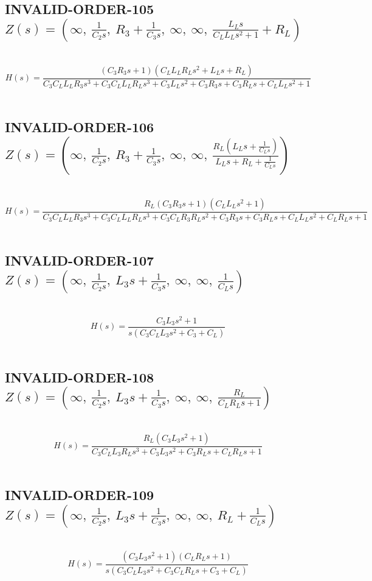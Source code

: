 \documentclass{article}
\begin{document}
\subsection{INVALID-ORDER-105 $Z(s) = \left( \infty, \  \frac{1}{C_{2} s}, \  R_{3} + \frac{1}{C_{3} s}, \  \infty, \  \infty, \  \frac{L_{L} s}{C_{L} L_{L} s^{2} + 1} + R_{L}\right)$ } \ 
\textbf{\[H(s) = \frac{\left(C_{3} R_{3} s + 1\right) \left(C_{L} L_{L} R_{L} s^{2} + L_{L} s + R_{L}\right)}{C_{3} C_{L} L_{L} R_{3} s^{3} + C_{3} C_{L} L_{L} R_{L} s^{3} + C_{3} L_{L} s^{2} + C_{3} R_{3} s + C_{3} R_{L} s + C_{L} L_{L} s^{2} + 1}\] } \ 
\subsection{INVALID-ORDER-106 $Z(s) = \left( \infty, \  \frac{1}{C_{2} s}, \  R_{3} + \frac{1}{C_{3} s}, \  \infty, \  \infty, \  \frac{R_{L} \left(L_{L} s + \frac{1}{C_{L} s}\right)}{L_{L} s + R_{L} + \frac{1}{C_{L} s}}\right)$ } \ 
\textbf{\[H(s) = \frac{R_{L} \left(C_{3} R_{3} s + 1\right) \left(C_{L} L_{L} s^{2} + 1\right)}{C_{3} C_{L} L_{L} R_{3} s^{3} + C_{3} C_{L} L_{L} R_{L} s^{3} + C_{3} C_{L} R_{3} R_{L} s^{2} + C_{3} R_{3} s + C_{3} R_{L} s + C_{L} L_{L} s^{2} + C_{L} R_{L} s + 1}\] } \ 
\subsection{INVALID-ORDER-107 $Z(s) = \left( \infty, \  \frac{1}{C_{2} s}, \  L_{3} s + \frac{1}{C_{3} s}, \  \infty, \  \infty, \  \frac{1}{C_{L} s}\right)$ } \ 
\textbf{\[H(s) = \frac{C_{3} L_{3} s^{2} + 1}{s \left(C_{3} C_{L} L_{3} s^{2} + C_{3} + C_{L}\right)}\] } \ 
\subsection{INVALID-ORDER-108 $Z(s) = \left( \infty, \  \frac{1}{C_{2} s}, \  L_{3} s + \frac{1}{C_{3} s}, \  \infty, \  \infty, \  \frac{R_{L}}{C_{L} R_{L} s + 1}\right)$ } \ 
\textbf{\[H(s) = \frac{R_{L} \left(C_{3} L_{3} s^{2} + 1\right)}{C_{3} C_{L} L_{3} R_{L} s^{3} + C_{3} L_{3} s^{2} + C_{3} R_{L} s + C_{L} R_{L} s + 1}\] } \ 
\subsection{INVALID-ORDER-109 $Z(s) = \left( \infty, \  \frac{1}{C_{2} s}, \  L_{3} s + \frac{1}{C_{3} s}, \  \infty, \  \infty, \  R_{L} + \frac{1}{C_{L} s}\right)$ } \ 
\textbf{\[H(s) = \frac{\left(C_{3} L_{3} s^{2} + 1\right) \left(C_{L} R_{L} s + 1\right)}{s \left(C_{3} C_{L} L_{3} s^{2} + C_{3} C_{L} R_{L} s + C_{3} + C_{L}\right)}\] } \ 
\end{document}
